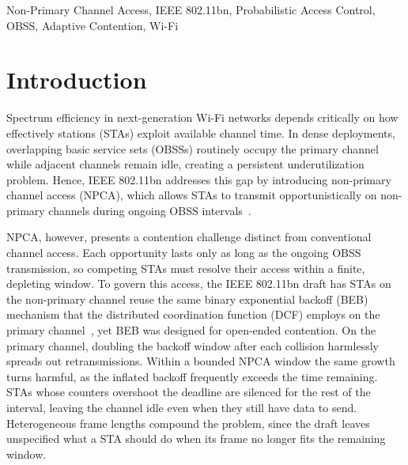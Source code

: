 \documentclass[journal,10pt]{IEEEtran}
\begin{document}
\begin{IEEEkeywords}
Non-Primary Channel Access, IEEE 802.11bn, Probabilistic Access Control, OBSS, Adaptive Contention, Wi-Fi
\end{IEEEkeywords}

\IEEEpeerreviewmaketitle

\section{Introduction}
\label{sec:introduction}

Spectrum efficiency in next-generation Wi-Fi networks depends critically on how effectively stations (STAs) exploit available channel time. In dense deployments, overlapping basic service sets (OBSSs) routinely occupy the primary channel while adjacent channels remain idle, creating a persistent underutilization problem. Hence, IEEE 802.11bn addresses this gap by introducing non-primary channel access (NPCA), which allows STAs to transmit opportunistically on non-primary channels during ongoing OBSS intervals~\cite{ieee80211bn,wei2024non}.

NPCA, however, presents a contention challenge distinct from conventional channel access. Each opportunity lasts only as long as the ongoing OBSS transmission, so competing STAs must resolve their access within a finite, depleting window. To govern this access, the IEEE 802.11bn draft has STAs on the non-primary channel reuse the same binary exponential backoff (BEB) mechanism that the distributed coordination function (DCF) employs on the primary channel~\cite{ieee80211bn}, yet BEB was designed for open-ended contention. On the primary channel, doubling the backoff window after each collision harmlessly spreads out retransmissions. Within a bounded NPCA window the same growth turns harmful, as the inflated backoff frequently exceeds the time remaining. STAs whose counters overshoot the deadline are silenced for the rest of the interval, leaving the channel idle even when they still have data to send. Heterogeneous frame lengths compound the problem, since the draft leaves unspecified what a STA should do when its frame no longer fits the remaining window.

\end{document}
